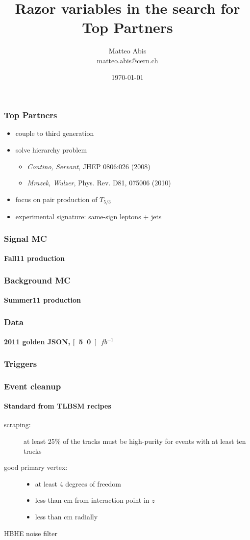 \documentclass[ukenglish]{beamer}
\title[Razor for Top Partners]{Razor variables in the search for Top
Partners}
\author{Matteo Abis\\
\url{matteo.abis@cern.ch}}
\institute{Università di Padova and INFN}
\date{\today}
\begin{document}
\begin{frame}
  \titlepage
\end{frame}
 
\begin{frame}
    \frametitle{Top Partners}
    \begin{itemize}
        \item couple to third generation
        \item solve hierarchy problem
            \begin{itemize}
                \item \emph{Contino, Servant}, JHEP 0806:026 (2008)
                \item \emph{Mrazek, Wulzer}, Phys. Rev. D81, 075006 (2010)
            \end{itemize}
        \item focus on pair production of $T_{5/3}$
        \item experimental signature: same-sign leptons + jets
    \end{itemize}
\end{frame}

\begin{frame}
    \frametitle{Signal MC}
    \framesubtitle{Fall11 production}
    
\end{frame}

\begin{frame}
    \frametitle{Background MC}
    \framesubtitle{Summer11 production}
    
\end{frame}

\begin{frame}
    \frametitle{Data}
    \framesubtitle{2011 golden JSON, \unit[5.0]{$fb^{-1}$}}
    
\end{frame}

\begin{frame}
    \frametitle{Triggers}
    
\end{frame}

\begin{frame}
    \frametitle{Event cleanup}
    \framesubtitle{Standard from TLBSM recipes}
    \begin{description}
        \item[scraping:] at least 25\% of the tracks must be high-purity for events
            with at least ten tracks
        \item[good primary vertex:] 
            \begin{itemize}
                \item at least 4 degrees of freedom
                \item less than \unit[25]{cm} from interaction point in $z$
                \item less than \unit[2]{cm} radially
            \end{itemize}
        \item[HBHE noise filter] 
    \end{description}
\end{frame}
\end{document}
